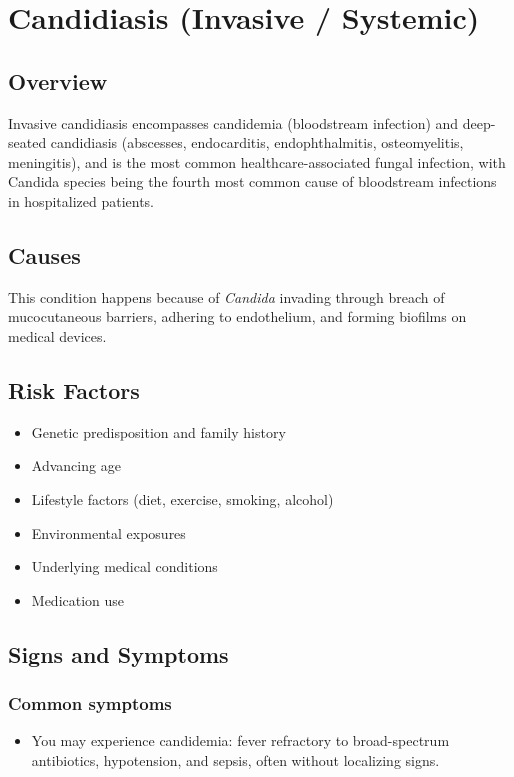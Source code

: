 \chapter{Candidiasis (Invasive / Systemic)}
\label{sec:Candidiasis Systemic}

\section{Overview}
Invasive candidiasis encompasses candidemia (bloodstream infection) and deep-seated candidiasis (abscesses, endocarditis, endophthalmitis, osteomyelitis, meningitis), and is the most common healthcare-associated fungal infection, with Candida species being the fourth most common cause of bloodstream infections in hospitalized patients.
\section{Causes}
This condition happens because of \textit{Candida} invading through breach of mucocutaneous barriers, adhering to endothelium, and forming biofilms on medical devices.     
\section{Risk Factors}

\begin{itemize}[noitemsep]
  \item Genetic predisposition and family history
  \item Advancing age
  \item Lifestyle factors (diet, exercise, smoking, alcohol)
  \item Environmental exposures
  \item Underlying medical conditions
  \item Medication use
\end{itemize}
\section{Signs and Symptoms}

\subsection{Common symptoms}
\begin{itemize}[noitemsep]
  \item You may experience candidemia: fever refractory to broad-spectrum antibiotics, hypotension, and sepsis, often without localizing signs. 
  \end{itemize}

